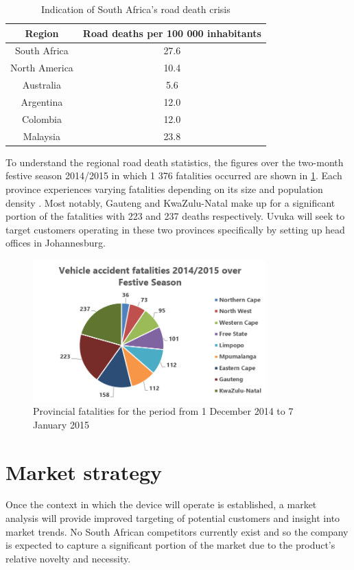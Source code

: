 \begin{table}[htbp]
  \centering
  \caption{Indication of South Africa's road death crisis}
    \begin{tabular}{cc}
    \toprule
    \textbf{Region} & \textbf{Road deaths per 100 000 inhabitants} \\
    \midrule
    South Africa & 27.6 \\
    North America & 10.4 \\
    Australia & 5.6 \\
    Argentina & 12.0 \\
    Colombia & 12.0 \\
    Malaysia & 23.8 \\
    \bottomrule
    \end{tabular}%
  \label{tab:deaths100thousand}%
\end{table}%

To understand the regional road death statistics, the figures over the two-month festive season 2014/2015 in which 1 376 fatalities occurred are shown in \cref{fig:festiveSeason}. Each province experiences varying fatalities depending on its size and population density \cite{ProvincialFestiveStats}. Most notably, Gauteng and KwaZulu-Natal make up for a significant portion of the fatalities with 223 and 237 deaths respectively. Uvuka will seek to target customers operating in these two provinces specifically by setting up head offices in Johannesburg.

\begin{figure}[H]
\centering
\includegraphics[width=0.8\textwidth]{images/provincial_fatalities.PNG}
\vskip10pt
\caption[Provincial fatalities for the period from 1 December 2014 to 7 January 2015]{Provincial fatalities for the period from 1 December 2014 to 7 January 2015}
\label{fig:festiveSeason}
\end{figure}

\section{Market strategy}
Once the context in which the device will operate is established, a market analysis will provide improved targeting of potential customers and insight into market trends. No South African competitors currently exist and so the company is expected to capture a significant portion of the market due to the product’s relative novelty and necessity.

